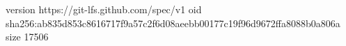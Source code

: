 version https://git-lfs.github.com/spec/v1
oid sha256:ab835d853c8616717f9a57c2f6d08aeebb00177c19f96d9672ffa8088b0a806a
size 17506
